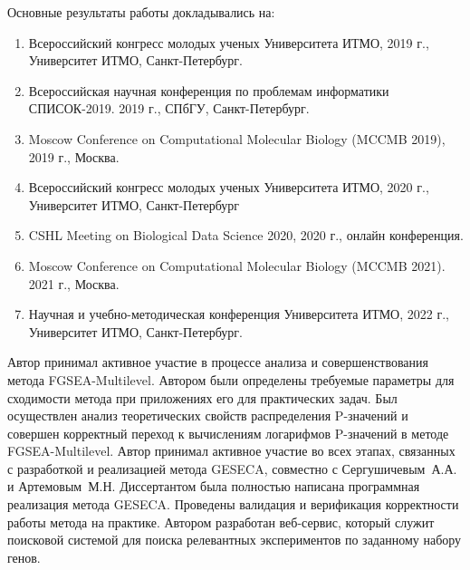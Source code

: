 {\probation}
Основные результаты работы докладывались на:
\begin{enumerate}
    \item Всероссийский конгресс молодых ученых Университета ИТМО, 2019 г., Университет ИТМО, Санкт-Петербург.
    \item Всероссийская научная конференция по проблемам информатики СПИСОК-2019. 2019 г., СПбГУ, Санкт-Петербург.
    \item Moscow Conference on Computational Molecular Biology (MCCMB 2019), 2019 г., Москва.
    \item Всероссийский конгресс молодых ученых Университета ИТМО, 2020 г., Университет ИТМО, Санкт-Петербург
    \item CSHL Meeting on Biological Data Science 2020,  2020 г., онлайн конференция.
    \item Moscow Conference on Computational Molecular Biology (MCCMB 2021). 2021 г., Москва.
    \item Научная и учебно-методическая конференция Университета ИТМО, 2022 г., Университет ИТМО, Санкт-Петербург.
\end{enumerate}

{\contribution} Автор принимал активное участие в процессе анализа и совершенствования метода FGSEA-Multilevel. 
Автором были определены требуемые параметры для сходимости метода при приложениях его для практических задач. 
Был осуществлен анализ теоретических свойств распределения P-значений и совершен корректный переход к вычислениям логарифмов P-значений в методе FGSEA-Multilevel.
Автор принимал активное участие во всех этапах, связанных с разработкой и реализацией метода GESECA, совместно с Сергушичевым~А.А. и Артемовым~М.Н.
Диссертантом была полностью написана программная реализация метода GESECA.
Проведены валидация и верификация корректности работы метода на практике.
Автором разработан веб-сервис, который служит поисковой системой для поиска релевантных экспериментов по заданному набору генов.

